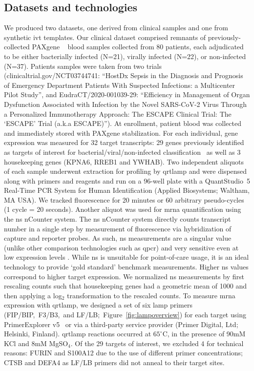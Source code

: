 \documentclass[../thesis.tex]{subfiles}
\begin{document}
\subsection{Datasets and technologies \label{sec:data}}
We produced two datasets, one derived from clinical samples and one from synthetic \gls{ivt}  templates. Our clinical dataset comprised remnants of previously-collected PAXgene ~\citep{ram-mohan_using_2022} blood samples collected from 80 patients, each adjudicated to be either bacterially infected (N=21), virally infected (N=22), or non-infected (N=37). 
Patients samples were taken from two trials (clinicaltrial.gov/NCT03744741: ``HostDx Sepsis in the Diagnosis and Prognosis of Emergency Department Patients With Suspected Infections: a Multicenter Pilot Study'', and EudraCT/2020-001039-29: ``Efficiency in Management of Organ Dysfunction Associated with Infection by the Novel SARS-CoV-2 Virus Through a Personalized Immunotherapy Approach: The ESCAPE Clinical Trial: The `ESCAPE' Trial (a.k.a ESCAPE)'').
At enrollment, patient blood was collected and immediately stored with PAXgene  stabilization. For each individual, gene expression was measured for 32 target  transcripts: 29 genes previously identified as targets of interest for bacterial/viral/non-infected classification~\citep{he_optimization_2021} as well as 3 housekeeping genes (KPNA6, RREB1 and YWHAB). Two independent aliquots of each sample underwent  extraction for profiling by \gls{qrtlamp} and were dispensed along with primers and reagents and run on a 96-well plate with a QuantStudio\texttrademark~5 Real-Time PCR System for Human Identification (Applied Biosystems; Waltham, MA USA). We tracked fluorescence for 20 minutes or 60 arbitrary pseudo-cycles (1 cycle = 20 seconds). Another aliquot was used for \gls{mrna} quantification using the \gls{ns} nCounter system. The \gls{ns} nCounter system  directly counts transcript number in a single step by measurement of fluorescence via hybridization of capture and reporter probes. As such, \gls{ns} measurements are a singular value (unlike other comparison technologies such as \gls{qpcr}) and very sensitive even at low expression levels \citep{geiss_direct_2008}. While \gls{ns} is unsuitable for point-of-care usage, it is an ideal technology to provide `gold standard' benchmark measurements. Higher \gls{ns} values correspond to higher target expression. We normalized \gls{ns} measurements by first rescaling counts such that housekeeping genes had a geometric mean of 1000 and then applying a \textsf{log}$_{2}$ transformation to the rescaled counts. To measure \gls{mrna} expression with \gls{qrtlamp}, we designed a set of six \gls{lamp} primers (FIP/BIP,~F3/B3,~and  LF/LB;~Figure~\ref{fig:lampoverview}) for each target using PrimerExplorer v5~\citep{eiken_primerexplorer_2019} or via a third-party service provider (Primer Digital, Ltd; Helsinki, Finland). \Gls{qrtlamp} reactions occurred at $65^{\circ}$C, in the presence of 90mM KCl and 8mM MgSO$_4$. Of the 29 targets of interest, we excluded 4 for technical reasons: {FURIN} and {S100A12} due to the use of different primer concentrations; {CTSB} and {DEFA4} as LF/LB primers did not anneal to their target sites.
\end{document}
